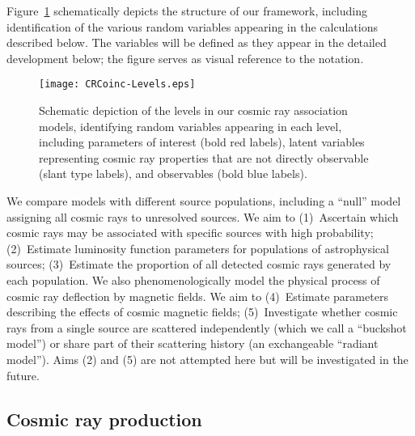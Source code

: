 Figure~\ref{fig:levels} schematically depicts the structure of our
framework, including identification of the various random variables
appearing in the calculations described below.  The variables will
be defined as they appear in the detailed development below; the
figure serves as visual reference to the notation.

\begin{figure}
\centerline{\texttt{[image: CRCoinc-Levels.eps]}}
\caption{Schematic depiction of the levels in our cosmic ray association
models, identifying random variables appearing in each level, including
parameters of interest (bold red labels), latent variables representing cosmic ray
properties that are not directly observable (slant type labels), and
observables (bold blue labels).}
\label{fig:levels}
\end{figure}

We compare models with different source populations, including a ``null''
model assigning all cosmic rays to unresolved sources.  We aim to
(1)~Ascertain which cosmic rays may be associated with specific sources with
high probability; (2)~Estimate luminosity function parameters for
populations of astrophysical sources; (3)~Estimate the proportion of all
detected cosmic rays generated by each population.  We also
phenomenologically model the physical process of cosmic ray deflection by
magnetic fields.  We aim to (4)~Estimate parameters describing the effects
of cosmic magnetic fields; (5)~Investigate whether cosmic rays from a single
source are scattered independently (which we call a ``buckshot model'') or
share part of their scattering history (an exchangeable ``radiant model'').
Aims (2) and (5) are not attempted here but will be investigated in the future.

\subsection{Cosmic ray production}


